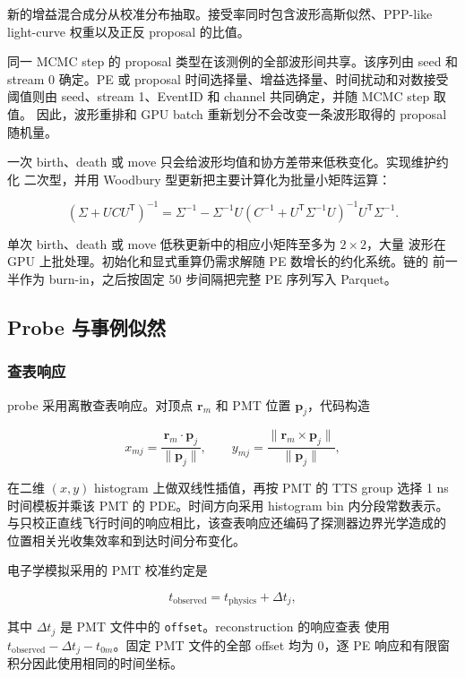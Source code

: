 \documentclass[UTF8,a4paper,11pt]{ctexart}
\begin{document}
新的增益混合成分从校准分布抽取。接受率同时包含波形高斯似然、PPP-like
light-curve 权重以及正反 proposal 的比值。

同一 MCMC step 的 proposal 类型在该测例的全部波形间共享。该序列由 seed 和
stream 0 确定。PE 或 proposal 时间选择量、增益选择量、时间扰动和对数接受
阈值则由 seed、stream 1、EventID 和 channel 共同确定，并随 MCMC step 取值。
因此，波形重排和 GPU batch 重新划分不会改变一条波形取得的 proposal 随机量。

一次 birth、death 或 move 只会给波形均值和协方差带来低秩变化。实现维护约化
二次型，并用 Woodbury 型更新把主要计算化为批量小矩阵运算：

\[
(\Sigma+UCU^{\mathsf T})^{-1}
=\Sigma^{-1}-\Sigma^{-1}U
(C^{-1}+U^{\mathsf T}\Sigma^{-1}U)^{-1}
U^{\mathsf T}\Sigma^{-1}.
\]

单次 birth、death 或 move 低秩更新中的相应小矩阵至多为 \(2\times2\)，大量
波形在 GPU 上批处理。初始化和显式重算仍需求解随 PE 数增长的约化系统。链的
前一半作为 burn-in，之后按固定 50 步间隔把完整 PE 序列写入 Parquet。

\subsection{Probe 与事例似然}

\subsubsection{查表响应}

probe 采用离散查表响应。对顶点 \(\mathbf r_m\) 和 PMT 位置 \(\mathbf p_j\)，代码构造

\[
x_{mj}=\frac{\mathbf r_m\cdot\mathbf p_j}{\lVert\mathbf p_j\rVert},
\qquad
y_{mj}=\frac{\lVert\mathbf r_m\times\mathbf p_j\rVert}{\lVert\mathbf p_j\rVert},
\]

在二维 \((x,y)\) histogram 上做双线性插值，再按 PMT 的 TTS group 选择 1 ns
时间模板并乘该 PMT 的 PDE。时间方向采用 histogram bin 内分段常数表示。
与只校正直线飞行时间的响应相比，该查表响应还编码了探测器边界光学造成的
位置相关光收集效率和到达时间分布变化\cite{dou2023probe,liu2025tao}。

电子学模拟采用的 PMT 校准约定是

\[
t_{\mathrm{observed}}=t_{\mathrm{physics}}+\Delta t_j,
\]

其中 \(\Delta t_j\) 是 PMT 文件中的 \texttt{offset}。reconstruction 的响应查表
使用 \(t_{\mathrm{observed}}-\Delta t_j-t_{0m}\)。固定 PMT 文件的全部 offset
均为 0，逐 PE 响应和有限窗积分因此使用相同的时间坐标。
\end{document}
